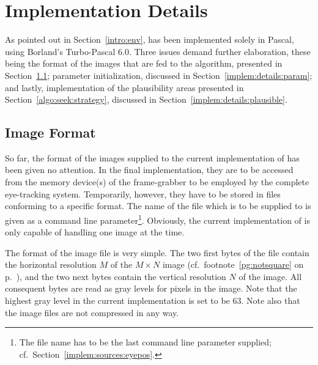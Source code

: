 
\section{Implementation Details}
\label{implem:details}

As pointed out in Section~\ref{intro:env}, {\octopus} has been
implemented solely in Pascal, using Borland's Turbo-Pascal 6.0.  Three
issues demand further elaboration, these being the format of the
images that are fed to the algorithm, presented in
Section~\ref{implem:details:format}; parameter initialization,
discussed in Section~\ref{implem:details:param}; and lastly,
implementation of the plausibility areas presented in
Section~\ref{algo:seek:strategy}, discussed in
Section~\ref{implem:details:plausible}.

\subsection{Image Format}
\label{implem:details:format}

So far, the format of the images supplied to the current
implementation of {\octopus} has been given no attention.  In the
final implementation, they are to be accessed from the memory
device(s) of the frame-grabber to be employed by the complete
eye-tracking system.  Temporarily, however, they have to be stored in
files conforming to a specific format.  The name of the file which is
to be supplied to {\octopus} is given as a command line
parameter\footnote{The file name has to be the last command line
  parameter supplied; cf.\ Section~\ref{implem:sources:eyepos}.}.
Obviously, the current implementation of {\octopus} is only capable of
handling one image at the time.

The format of the image file is very simple.  The two first bytes of
the file contain the horizontal resolution $M$ of the $M\times N$
image (cf.\ footnote~\ref{pg:notsquare} on p.~\pageref{pg:notsquare}),
and the two next bytes contain the vertical resolution $N$ of the
image.  All consequent bytes are read as gray levels for pixels in the
image.  Note that the highest gray level in the current implementation
is set to be 63.  Note also that the image files are not compressed in
any way.

